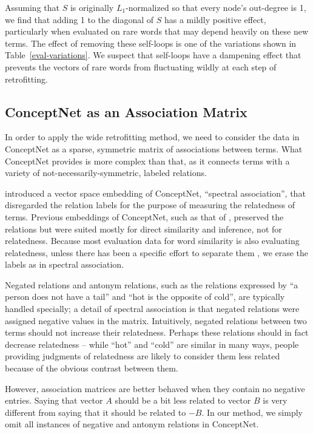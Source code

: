 \documentclass[11pt,letterpaper]{article}
\begin{document}
Assuming that $S$ is originally $L_1$-normalized so that every node's
out-degree is 1, we find that adding 1 to the diagonal of $S$ has a mildly
positive effect, particularly when evaluated on rare words that may depend
heavily on these new terms. The effect of removing these self-loops is one of
the variations shown in Table~\ref{eval-variations}.  We suspect that
self-loops have a dampening effect that prevents the vectors of rare words from
fluctuating wildly at each step of retrofitting.

\subsection{ConceptNet as an Association Matrix}

In order to apply the wide retrofitting method, we need to consider the data in
ConceptNet as a sparse, symmetric matrix of associations between terms. What
ConceptNet provides is more complex than that, as it connects terms with a
variety of not-necessarily-symmetric, labeled relations.

 introduced a vector space embedding of ConceptNet,
``spectral association'', that disregarded the relation labels for the purpose
of measuring the relatedness of terms. Previous embeddings of ConceptNet, such
as that of , preserved the relations but were
suited mostly for direct similarity and inference, not for relatedness. Because
most evaluation data for word similarity is also evaluating relatedness, unless
there has been a specific effort to separate them \cite{agirre2009similarity},
we erase the labels as in spectral association.

Negated relations and antonym relations, such as the relations expressed by
``a person does not have a tail'' and ``hot is the opposite of cold'', are
typically handled specially; a detail of spectral association is that negated
relations were assigned negative values in the matrix. Intuitively, negated
relations between two terms should not increase their relatedness. Perhaps
these relations should in fact decrease relatedness -- while ``hot'' and
``cold'' are similar in many ways, people providing judgments of relatedness
are likely to consider them less related because of the obvious contrast
between them.

However, association matrices are better behaved when they contain no negative
entries. Saying that vector $A$ should be a bit less related to vector
$B$ is very different from saying that it should be related to $-B$.
In our method, we simply omit all instances of negative and antonym
relations in ConceptNet.
\end{document}

